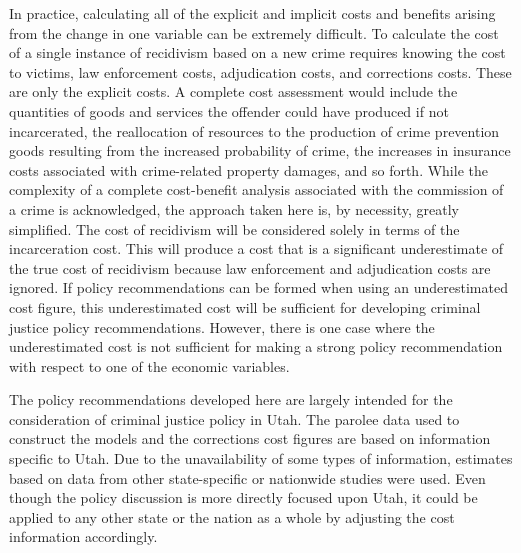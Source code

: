 In practice, calculating all of the explicit and implicit costs and benefits arising from the change in one variable can be extremely difficult.  To calculate the cost of a single instance of recidivism based on a new crime requires knowing the cost to victims, law enforcement costs, adjudication costs, and corrections costs.  These are only the explicit costs.  A complete cost assessment would include the quantities of goods and services the offender could have produced if not incarcerated, the reallocation of resources to the production of crime prevention goods resulting from the increased probability of crime, the increases in insurance costs associated with crime-related property damages, and so forth.  While the complexity of a complete cost-benefit analysis associated with the commission of a crime is acknowledged, the approach taken here is, by necessity, greatly simplified.  The cost of recidivism will be considered solely in terms of the incarceration cost.  This will produce a cost that is a significant underestimate of the true cost of recidivism because law enforcement and adjudication costs are ignored.  If policy recommendations can be formed when using an underestimated cost figure,  this underestimated cost will be sufficient for developing criminal justice policy recommendations.  However, there is one case where the underestimated cost is not sufficient for making a strong policy recommendation with respect to one of the economic variables.

The policy recommendations developed here are largely intended for the consideration of criminal justice policy in Utah.  The parolee data used to construct the models and the corrections cost figures are based on information specific to Utah.  Due to the unavailability of some types of information, estimates based on data from other state-specific or nationwide studies were used.  Even though the policy discussion is more directly focused upon Utah, it could be applied to any other state or the nation as a whole by adjusting the cost information accordingly.

